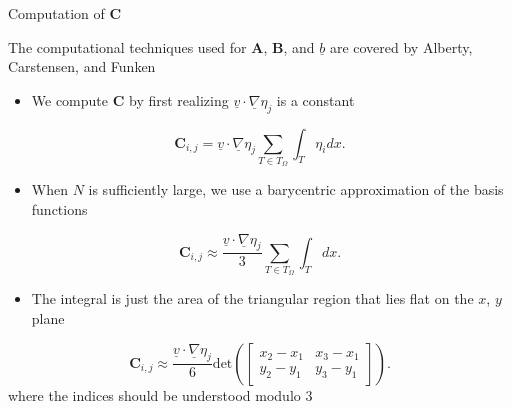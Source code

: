 \documentclass[10pt]{beamer}
\begin{document}
\begin{frame} {Computation of $\mathbf{C}$} \label{ComputationofC}

The computational techniques used for $\mathbf{A}$, $\mathbf{B}$, and $\underline{b}$ are covered by Alberty, Carstensen, and Funken
\begin{itemize}
\item We compute $\mathbf{C}$ by first realizing $\underline{v} \cdot \underline{\nabla}\eta_{j}$ is a constant
\end{itemize}
\begin{equation}
\mathbf{C}_{i,j} = \underline{v}\cdot \underline{\nabla}\eta_{j}\sum_{T \in T_{\Omega}}\int_{T}\eta_{i} dx.
\end{equation}

\begin{itemize}
\item When $N$ is sufficiently large, we use a barycentric approximation of the basis functions
\end{itemize}

\begin{equation}
\mathbf{C}_{i,j} \approx  \frac{\underline{v}\cdot \underline{\nabla}\eta_{j}}{3}\sum_{T \in T_{\Omega}}\int_{T} dx.
\end{equation}

\begin{itemize}
\item The integral is just the area of the triangular region that lies flat on the $x$, $y$ plane
\end{itemize}

\begin{equation}
 \mathbf{C}_{i,j}\approx \frac{\underline{v}\cdot \underline{\nabla}\eta_{j}}{6}\text{det}\left(\begin{bmatrix}x_{2}-x_{1} & x_{3}-x_{1} \\ y_{2}-y_{1} & y_{3}-y_{1} \end{bmatrix}\right).
\end{equation}
where the indices should be understood modulo 3

\hyperlink{Questions}{}
\end{frame}
\end{document}
